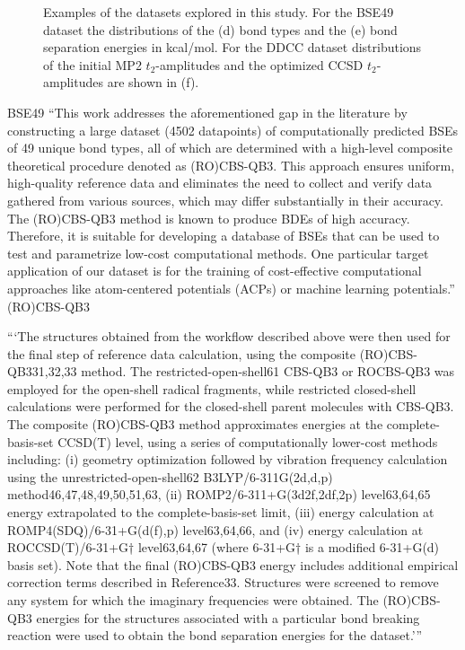 \documentclass[journal=jacsat,manuscript=article]{achemso}
\begin{document}
\begin{figure}[H]
\begin{subfigure}[b]{0.3\textwidth}
		\caption{}
		\label{fig:waterddccdistribution}
	\end{subfigure}	
	\caption{Examples of the datasets explored in this study. For the BSE49 dataset the distributions of the (d) bond types and the (e) bond separation energies in kcal/mol. For the DDCC dataset distributions of the initial MP2 $t_{2}$-amplitudes and the optimized CCSD $t_{2}$-amplitudes are shown in (f).}
	\label{fig:bse_data}
\end{figure}


BSE49
``This work addresses the aforementioned gap in the literature by constructing a large dataset (4502 datapoints) of computationally predicted BSEs of 49 unique bond types, all of which are determined with a high-level composite theoretical procedure denoted as (RO)CBS-QB3. This approach ensures uniform, high-quality reference data and eliminates the need to collect and verify data gathered from various sources, which may differ substantially in their accuracy. The (RO)CBS-QB3 method is known to produce BDEs of high accuracy. Therefore, it is suitable for developing a database of BSEs that can be used to test and parametrize low-cost computational methods. One particular target application of our dataset is for the training of cost-effective computational approaches like atom-centered potentials (ACPs) or machine learning potentials.''
(RO)CBS-QB3\cite{wood_restricted-open-shell_2006,montgomery_complete_1999,montgomery_complete_2000}  

```The structures obtained from the workflow described above were then used for the final step of reference data calculation, using the composite (RO)CBS-QB331,32,33 method. The restricted-open-shell61 CBS-QB3 or ROCBS-QB3 was employed for the open-shell radical fragments, while restricted closed-shell calculations were performed for the closed-shell parent molecules with CBS-QB3. The composite (RO)CBS-QB3 method approximates energies at the complete-basis-set CCSD(T) level, using a series of computationally lower-cost methods including: (i) geometry optimization followed by vibration frequency calculation using the unrestricted-open-shell62 B3LYP/6-311G(2d,d,p) method46,47,48,49,50,51,63, (ii) ROMP2/6-311+G(3d2f,2df,2p) level63,64,65 energy extrapolated to the complete-basis-set limit, (iii) energy calculation at ROMP4(SDQ)/6-31+G(d(f),p) level63,64,66, and (iv) energy calculation at ROCCSD(T)/6-31+G† level63,64,67 (where 6-31+G† is a modified 6-31+G(d) basis set). Note that the final (RO)CBS-QB3 energy includes additional empirical correction terms described in Reference33. Structures were screened to remove any system for which the imaginary frequencies were obtained. The (RO)CBS-QB3 energies for the structures associated with a particular bond breaking reaction were used to obtain the bond separation energies for the dataset.'''
\end{document}

